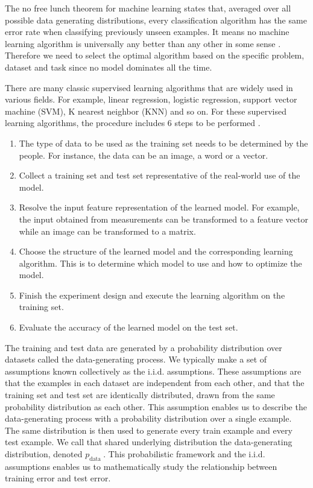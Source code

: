 The no free lunch theorem \cite{wolpert1996lack} for machine learning states that, averaged over all possible
data generating distributions, every classification algorithm has the same error
rate when classifying previously unseen examples. It means
no machine learning algorithm is universally any better than any other in some sense \cite{goodfellow2016deep}. Therefore we need to select the optimal algorithm based on the specific problem, dataset and task since no model dominates all the time.

There are many classic supervised learning algorithms that are widely used in various fields. For example, linear regression, logistic regression, support vector machine (SVM), K nearest neighbor (KNN) and so on.
For these supervised learning algorithms, the procedure includes 6 steps to be performed  \cite{praveena2017literature}.
\begin{enumerate}
\item The type of data to be used as the training set needs to be determined by the people. For instance, the data can be an image, a word or a vector.
\item Collect a training set and test set representative of the real-world use of the model.
\item Resolve the input feature representation of the learned model. For example, the input obtained from measurements can be transformed to a feature vector while an image can be transformed to a matrix.
\item Choose the structure of the learned model and the corresponding learning algorithm. This is to determine which model to use and how to optimize the model.
\item Finish the experiment design and execute the learning algorithm on the training set.
\item Evaluate the accuracy of the learned model on the test set.
\end{enumerate}


The training and test data are generated by a probability distribution over datasets called the data-generating process. We typically make a set of assumptions known collectively as the i.i.d. assumptions. These assumptions are that the examples in each dataset are independent from each other, and that the training set and test set are identically distributed, drawn from the same probability distribution as each other. This assumption enables us to describe the data-generating process with a probability distribution over a single example. The same distribution is then used to generate every train example and every test example. We call that shared underlying distribution the data-generating distribution, denoted $p_{\text {data }}$. This probabilistic framework and the i.i.d. assumptions enables us to mathematically study the relationship between training error and test error.


